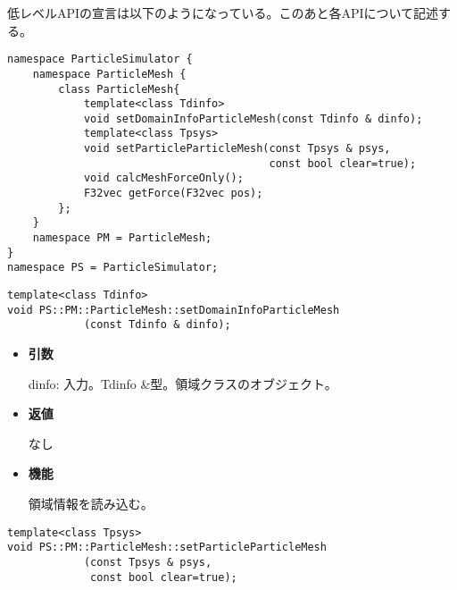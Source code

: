 
低レベルAPIの宣言は以下のようになっている。このあと各APIについて記述す
る。
\begin{lstlisting}[caption=ParticleMesh1]
namespace ParticleSimulator {
    namespace ParticleMesh {
        class ParticleMesh{
            template<class Tdinfo>
            void setDomainInfoParticleMesh(const Tdinfo & dinfo);
            template<class Tpsys>
            void setParticleParticleMesh(const Tpsys & psys,
                                         const bool clear=true);
            void calcMeshForceOnly();
            F32vec getForce(F32vec pos);
        };
    }
    namespace PM = ParticleMesh;
}
namespace PS = ParticleSimulator;
\end{lstlisting}


\begin{screen}
\begin{verbatim}
template<class Tdinfo>
void PS::PM::ParticleMesh::setDomainInfoParticleMesh
            (const Tdinfo & dinfo);
\end{verbatim}
\end{screen}

\begin{itemize}

\item {\bf 引数}

dinfo: 入力。Tdinfo \&型。領域クラスのオブジェクト。

\item {\bf 返値}

なし

\item {\bf 機能}

領域情報を読み込む。

\end{itemize}


\begin{screen}
\begin{verbatim}
template<class Tpsys>
void PS::PM::ParticleMesh::setParticleParticleMesh
            (const Tpsys & psys,
             const bool clear=true);
\end{verbatim}
\end{screen}

